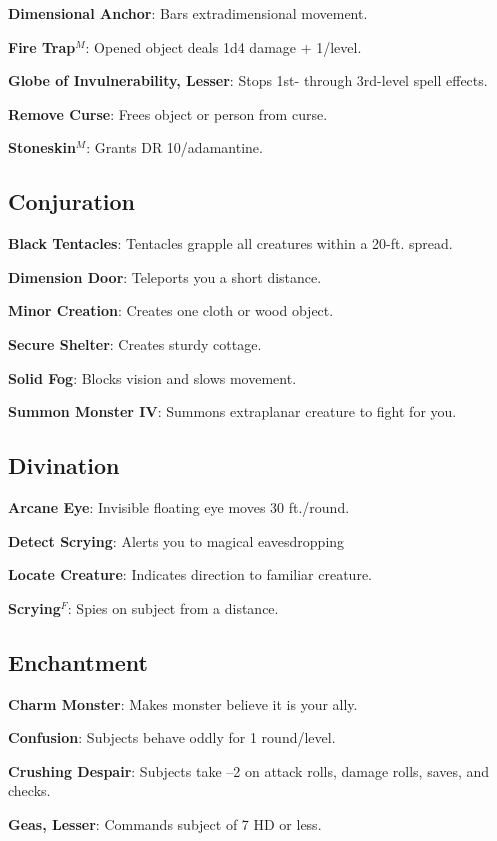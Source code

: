 \textbf{Dimensional Anchor}: Bars extradimensional movement.

\textbf{Fire Trap}\(^{M}\): Opened object deals 1d4 damage + 1/level.

\textbf{Globe of Invulnerability, Lesser}: Stops 1st- through 3rd-level spell effects.

\textbf{Remove Curse}: Frees object or person from curse.

\textbf{Stoneskin}\(^{M}\): Grants DR 10/adamantine.

\subsection{Conjuration}


\textbf{Black Tentacles}: Tentacles grapple all creatures within a 20-ft. spread.

\textbf{Dimension Door}: Teleports you a short distance.

\textbf{Minor Creation}: Creates one cloth or wood object.

\textbf{Secure Shelter}: Creates sturdy cottage.

\textbf{Solid Fog}: Blocks vision and slows movement.

\textbf{Summon Monster IV}: Summons extraplanar creature to fight for you.

\subsection{Divination}


\textbf{Arcane Eye}: Invisible floating eye moves 30 ft./round.

\textbf{Detect Scrying}: Alerts you to magical eavesdropping

\textbf{Locate Creature}: Indicates direction to familiar creature.

\textbf{Scrying}\(^{F}\): Spies on subject from a distance.

\subsection{Enchantment}


\textbf{Charm Monster}: Makes monster believe it is your ally.

\textbf{Confusion}: Subjects behave oddly for 1 round/level.

\textbf{Crushing Despair}: Subjects take --2 on attack rolls, damage rolls, saves, and checks.

\textbf{Geas, Lesser}: Commands subject of 7 HD or less.

